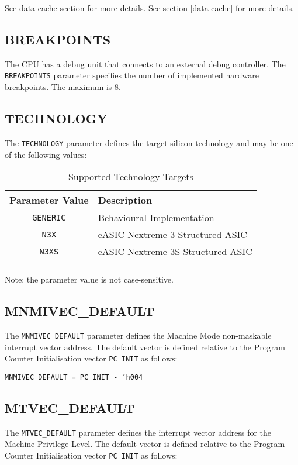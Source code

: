 \ifdefined\MARKDOWN
See data cache section for more details.
\else
See section \ref{data-cache}  for more details.
\fi

\subsection{BREAKPOINTS}\label{breakpoints}

The CPU has a debug unit that connects to an external debug controller.
The \texttt{BREAKPOINTS} parameter specifies the number of implemented hardware
breakpoints. The maximum is 8.

\subsection{TECHNOLOGY}\label{technology}

The \texttt{TECHNOLOGY} parameter defines the target silicon technology and may
be one of the following values:

\begin{longtable}[]{@{}cl@{}}
\toprule
Parameter Value & Description\tabularnewline
\midrule
\endhead
\texttt{GENERIC} & Behavioural Implementation\tabularnewline
\texttt{N3X} & eASIC Nextreme-3 Structured ASIC\tabularnewline
\texttt{N3XS} & eASIC Nextreme-3S Structured ASIC\tabularnewline
\bottomrule
\caption{Supported Technology Targets}
\label{tab:supported-tech-targets}

\end{longtable}

Note: the parameter value is not case-sensitive.

\subsection{MNMIVEC\_DEFAULT}\label{mnmivec_default}

The \texttt{MNMIVEC\_DEFAULT} parameter defines the Machine Mode non-maskable
interrupt vector address. The default vector is defined relative to the
Program Counter Initialisation vector \texttt{PC\_INIT} as follows:

\texttt{MNMIVEC\_DEFAULT = PC\_INIT - 'h004}

\subsection{MTVEC\_DEFAULT}\label{mtvec_default}

The \texttt{MTVEC\_DEFAULT} parameter defines the interrupt vector address for
the Machine Privilege Level. The default vector is defined relative to
the Program Counter Initialisation vector \texttt{PC\_INIT} as follows:

